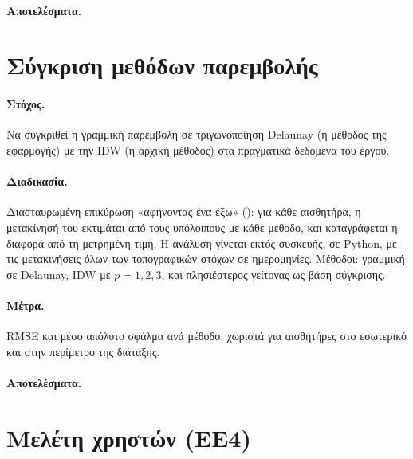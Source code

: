 \paragraph{Αποτελέσματα.}\mbox{}


\section{Σύγκριση μεθόδων παρεμβολής}
\label{sec:exp-interpolation}

\paragraph{Στόχος.} Να συγκριθεί η γραμμική παρεμβολή σε τριγωνοποίηση Delaunay (η μέθοδος της εφαρμογής) με την IDW (η αρχική μέθοδος) στα πραγματικά δεδομένα του έργου.

\paragraph{Διαδικασία.} Διασταυρωμένη επικύρωση «αφήνοντας ένα έξω» (): για κάθε αισθητήρα, η μετακίνησή του εκτιμάται από τους υπόλοιπους με κάθε μέθοδο, και καταγράφεται η διαφορά από τη μετρημένη τιμή. Η ανάλυση γίνεται εκτός συσκευής, σε Python, με τις μετακινήσεις όλων των τοπογραφικών στόχων σε  ημερομηνίες. Μέθοδοι: γραμμική σε Delaunay, IDW με $p = 1, 2, 3$, και πλησιέστερος γείτονας ως βάση σύγκρισης.

\paragraph{Μέτρα.} RMSE και μέσο απόλυτο σφάλμα ανά μέθοδο, χωριστά για αισθητήρες στο εσωτερικό και στην περίμετρο της διάταξης.

\paragraph{Αποτελέσματα.}\mbox{}


\section{Μελέτη χρηστών (ΕΕ4)}
\label{sec:exp-userstudy}

